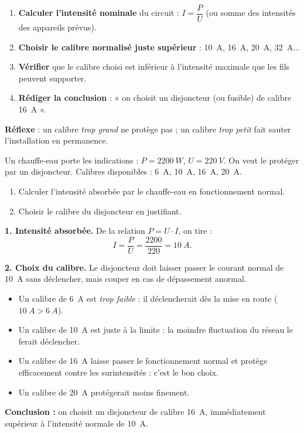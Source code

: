 \documentclass[11pt]{article}
\begin{document}
\begin{methode}
\begin{enumerate}
\item \textbf{Calculer l'intensité nominale} du circuit : $I = \dfrac{P}{U}$ (ou somme des intensités des appareils prévus).
\item \textbf{Choisir le calibre normalisé juste supérieur} : \SI{10}{A}, \SI{16}{A}, \SI{20}{A}, \SI{32}{A}...
\item \textbf{Vérifier} que le calibre choisi est inférieur à l'intensité maximale que les fils peuvent supporter.
\item \textbf{Rédiger la conclusion} : « on choisit un disjoncteur (ou fusible) de calibre \SI{16}{A} ».
\end{enumerate}
\textbf{Réflexe} : un calibre \emph{trop grand} ne protège pas ; un calibre \emph{trop petit} fait sauter l'installation en permanence.
\end{methode}

\begin{exoresolu}
Un chauffe-eau porte les indications : $P = \SI{2200}{W}$, $U = \SI{220}{V}$. On veut le protéger par un disjoncteur. Calibres disponibles : \SI{6}{A}, \SI{10}{A}, \SI{16}{A}, \SI{20}{A}.
\begin{enumerate}
\item Calculer l'intensité absorbée par le chauffe-eau en fonctionnement normal.
\item Choisir le calibre du disjoncteur en justifiant.
\end{enumerate}
\tcblower
\textbf{1. Intensité absorbée.} De la relation $P = U \cdot I$, on tire :
\[ I = \frac{P}{U} = \frac{2200}{220} = \SI{10}{A}. \]

\textbf{2. Choix du calibre.} Le disjoncteur doit laisser passer le courant normal de \SI{10}{A} sans déclencher, mais couper en cas de dépassement anormal.
\begin{itemize}
\item Un calibre de \SI{6}{A} est \emph{trop faible} : il déclencherait dès la mise en route ($\SI{10}{A} > \SI{6}{A}$).
\item Un calibre de \SI{10}{A} est juste à la limite : la moindre fluctuation du réseau le ferait déclencher.
\item Un calibre de \SI{16}{A} laisse passer le fonctionnement normal et protège efficacement contre les surintensités : c'est le bon choix.
\item Un calibre de \SI{20}{A} protégerait moins finement.
\end{itemize}
\textbf{Conclusion :} on choisit un disjoncteur de calibre \SI{16}{A}, immédiatement supérieur à l'intensité normale de \SI{10}{A}.
\end{exoresolu}
\end{document}
